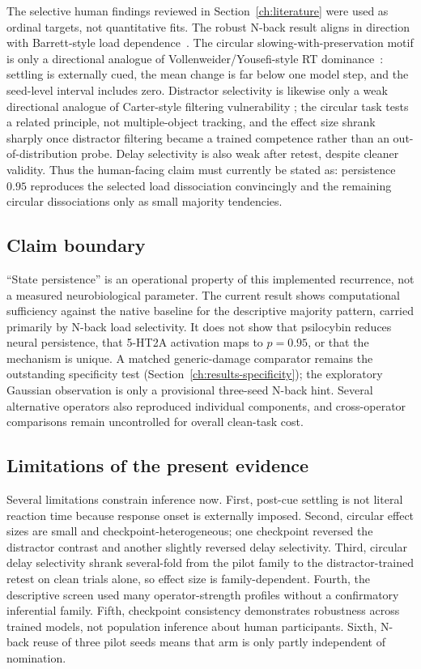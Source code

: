 The selective human findings reviewed in Section~\ref{ch:literature} were used
as ordinal targets, not quantitative fits. The robust N-back result aligns in
direction with Barrett-style load dependence~\cite{barrett2018}. The circular
slowing-with-preservation motif is only a directional analogue of
Vollenweider/Yousefi-style RT dominance~\cite{vollenweider1998,yousefi2025}:
settling is externally cued, the mean change is far below one model step, and
the seed-level interval includes zero. Distractor selectivity is likewise only
a weak directional analogue of Carter-style filtering vulnerability
\cite{carter2005}; the circular task tests a related principle, not
multiple-object tracking, and the effect size shrank sharply once distractor
filtering became a trained competence rather than an out-of-distribution
probe. Delay selectivity is also weak after retest, despite cleaner validity.
Thus the human-facing claim must currently be stated as: persistence $0.95$
reproduces the selected load dissociation convincingly and the remaining
circular dissociations only as small majority tendencies.

\subsection{Claim boundary}

``State persistence'' is an operational property of this implemented
recurrence, not a measured neurobiological parameter. The current result shows
computational sufficiency against the native baseline for the descriptive
majority pattern, carried primarily by N-back load selectivity. It does not
show that psilocybin reduces neural persistence, that 5-HT2A activation maps to
$p=0.95$, or that the mechanism is unique. A matched generic-damage comparator
remains the outstanding specificity test
(Section~\ref{ch:results-specificity}); the exploratory Gaussian observation
is only a provisional three-seed N-back hint. Several alternative operators
also reproduced individual components, and cross-operator comparisons remain
uncontrolled for overall clean-task cost.

\subsection{Limitations of the present evidence}

Several limitations constrain inference now. First, post-cue settling is not
literal reaction time because response onset is externally imposed. Second,
circular effect sizes are small and checkpoint-heterogeneous; one checkpoint
reversed the distractor contrast and another slightly reversed delay
selectivity. Third, circular delay selectivity shrank several-fold from the
pilot family to the distractor-trained retest on clean trials alone, so effect
size is family-dependent. Fourth, the descriptive screen used many
operator-strength profiles without a confirmatory inferential family.
Fifth, checkpoint consistency demonstrates robustness across trained models,
not population inference about human participants. Sixth, N-back reuse of three
pilot seeds means that arm is only partly independent of nomination.

